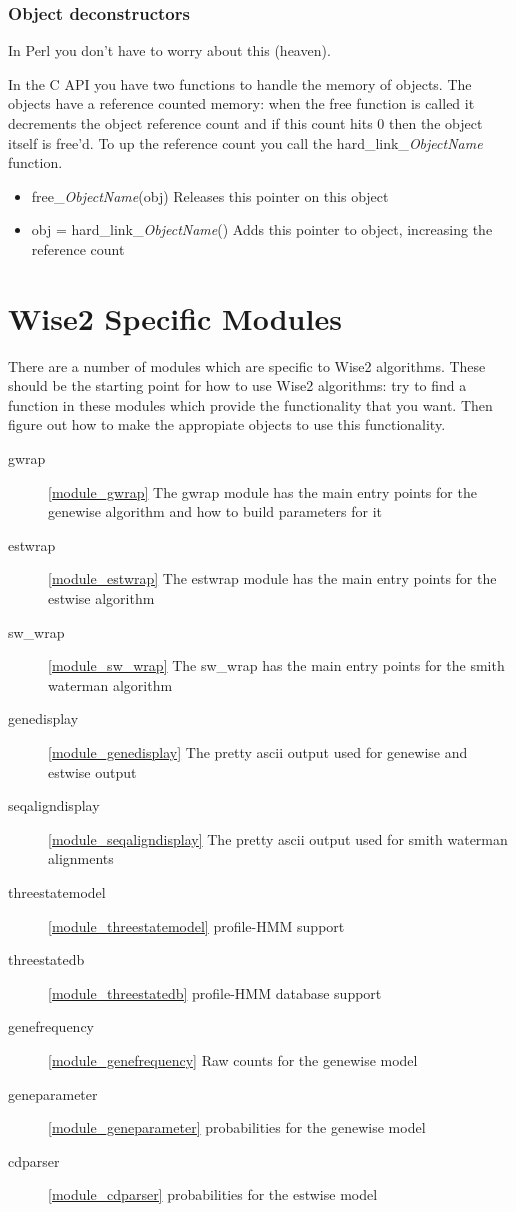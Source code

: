 \subsubsection{Object deconstructors}

In Perl you don't have to worry about this (heaven).


In the C API you have two functions to handle the memory of objects. 
The objects have a reference counted memory: when the free function is
called it decrements the object reference count and if this count
hits 0 then the object itself is free'd. To up the reference count you
call the hard\_link\_\emph{ObjectName} function.

\begin{itemize}
\item free\_\emph{ObjectName}(obj) Releases this pointer on this object
\item obj = hard\_link\_\emph{ObjectName}() Adds this pointer to object, increasing the
reference count
\end{itemize}

\section{Wise2 Specific Modules}

There are a number of modules which are specific to Wise2 algorithms.
These should be the starting point for how to use Wise2 algorithms:
try to find a function in these modules which provide the functionality
that you want. Then figure out how to make the appropiate objects
to use this functionality.

\begin{description}
\item[gwrap] \ref{module_gwrap} The gwrap module has the main entry points
for the genewise algorithm and how to build parameters for it
\item[estwrap] \ref{module_estwrap} The estwrap module has the main entry
points for the estwise algorithm
\item[sw\_wrap] \ref{module_sw_wrap} The sw\_wrap has the main entry points for
the smith waterman algorithm
\item[genedisplay] \ref{module_genedisplay} The pretty ascii output used
for genewise and estwise output
\item[seqaligndisplay] \ref{module_seqaligndisplay} The pretty ascii output used
for smith waterman alignments
\item[threestatemodel] \ref{module_threestatemodel} profile-HMM support
\item[threestatedb] \ref{module_threestatedb} profile-HMM database support
\item[genefrequency] \ref{module_genefrequency} Raw counts for the genewise model
\item[geneparameter] \ref{module_geneparameter} probabilities for the genewise model
\item[cdparser] \ref{module_cdparser} probabilities for the estwise model
\end{description}

